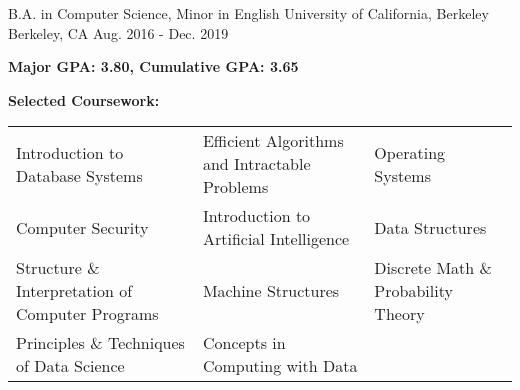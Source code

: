 

\begin{cventries}

  \cventry
    {B.A. in Computer Science, Minor in English} %
    {University of California, Berkeley} %
    {Berkeley, CA} %
    {Aug. 2016 - Dec. 2019} %
    {
      \begin{cvitems}
        \item \textbf{Major GPA: 3.80, Cumulative GPA: 3.65}
        \item \textbf{Selected Coursework:}
      \end{cvitems}
      \vspace{5mm}
      \hspace{2.8mm}
      \begin{tabular}{p{7cm} p{7cm} p{7cm}}
        Introduction to Database Systems & Efficient Algorithms and Intractable Problems & Operating Systems \\
        Computer Security & Introduction to Artificial Intelligence & Data Structures \\
        Structure \& Interpretation of Computer Programs & Machine Structures & Discrete Math \& Probability Theory \\
        Principles \& Techniques of Data Science & Concepts in Computing with Data & \\
      \end{tabular}
    }
\end{cventries}
